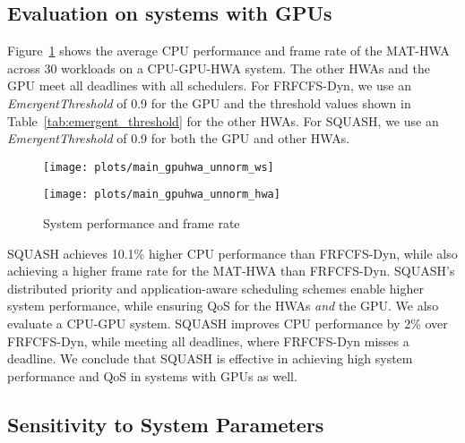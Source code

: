 \documentclass[10pt,letterpaper]{article}
\begin{document}
\subsection{Evaluation on systems with GPUs}
Figure~\ref{plot:gpu_average_performance} shows the average CPU performance
and frame rate of the MAT-HWA across 30 workloads on a CPU-GPU-HWA
system. The other HWAs and the GPU meet all deadlines with all schedulers.
For FRFCFS-Dyn, we use an {\it EmergentThreshold} of 0.9 for the GPU and the
threshold values shown in Table~\ref{tab:emergent_threshold} for the other HWAs.
For SQUASH, we use an {\it EmergentThreshold} of 0.9 for both the GPU and other HWAs.





\begin{figure}[ht!]
\centering
\begin{minipage}{0.40\textwidth}
\centering
    \texttt{[image: plots/main\_gpuhwa\_unnorm\_ws]}
  \end{minipage}
  \begin{minipage}{0.40\textwidth}
    \centering
\texttt{[image: plots/main\_gpuhwa\_unnorm\_hwa]}
  \end{minipage}
\caption{System performance and frame rate}
  \label{plot:gpu_average_performance}
\end{figure}



SQUASH achieves 10.1\% higher CPU performance than FRFCFS-Dyn, while also
achieving a higher frame rate for the MAT-HWA than FRFCFS-Dyn. SQUASH's
distributed priority and application-aware scheduling schemes enable higher
system performance, while ensuring QoS for the HWAs \emph{and} the GPU.  We also
evaluate a CPU-GPU system. SQUASH improves CPU performance by 2\% over
FRFCFS-Dyn, while meeting all deadlines, where FRFCFS-Dyn misses a deadline. We
conclude that SQUASH is effective in achieving high system performance and QoS
in systems with GPUs as well.



\subsection{Sensitivity to System Parameters}
\end{document}
